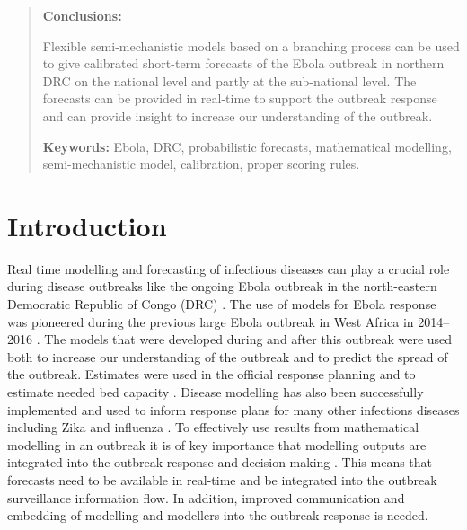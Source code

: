 \documentclass[12pt]{article}
\begin{document}
\begin{abstract}
  \medskip
  
  {\bf Conclusions:}

  Flexible semi-mechanistic models based on a branching process can be used to give calibrated short-term forecasts of the Ebola outbreak in northern DRC on the national level and partly at the sub-national level. The forecasts can be provided in real-time to support the outbreak response and can provide  insight to increase our understanding of the outbreak.

  \medskip

  {\bf Keywords:} Ebola, DRC, probabilistic forecasts, mathematical modelling, semi-mechanistic model, calibration, proper scoring rules.

\end{abstract}

\newpage

\tableofcontents

\newpage

\section{Introduction}


Real time modelling and forecasting of infectious diseases can play a crucial role during disease outbreaks like the ongoing Ebola outbreak in the north-eastern Democratic Republic of Congo (DRC) \cite{heesterbeekModelingInfectiousDisease2015,riversUsingOutbreakScience2019a}. The use of models for Ebola response was pioneered during the previous large Ebola outbreak in West Africa in 2014--2016 \cite{chretienMathematicalModelingWest}. The models that were developed during and after this outbreak were used both to increase our understanding of the outbreak and to predict the spread of the outbreak. Estimates were used in the official response planning \cite{whoebolaresponseteamEbolaVirusDisease2014} and to estimate needed bed capacity \cite{camachoTemporalChangesEbola2015}. Disease modelling has also been successfully implemented and used to inform response plans for many other infections diseases including Zika \cite{kobresSystematicReviewEvaluation2019} and influenza \cite{chretienInfluenzaForecastingHuman2014}. To effectively use results from mathematical modelling in an outbreak it is of key importance that modelling outputs are integrated into the outbreak response and decision making \cite{riversUsingOutbreakScience2019a}. This means that forecasts need to be available in real-time and be integrated into the outbreak surveillance information flow. In addition, improved communication and embedding of modelling and modellers into the outbreak response is needed. 
\end{document}
